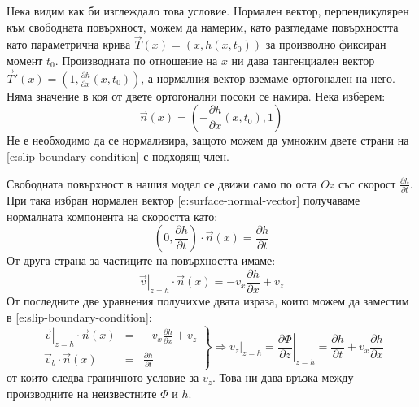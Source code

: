\documentclass[12pt]{article}
\numberwithin{equation}{section}
\begin{document}
Нека видим как би изглеждало това условие. Нормален вектор, перпендикулярен към свободната повърхност, можем да намерим, като разгледаме повърхността като параметрична крива $\vec{T}(x)=(x, h(x,t_0))$ за произволно фиксиран момент $t_0$. Производната по отношение на $x$ ни дава тангенциален вектор $\vec{T}'(x)=(1, \frac{\partial h}{\partial x}(x,t_0))$, а нормалния вектор вземаме ортогонален на него. Няма значение в коя от двете ортогонални посоки се намира. Нека изберем:
\begin{equation}
    \label{e:surface-normal-vector}
    \vec{n}(x)=(-\frac{\partial h}{\partial x}(x,t_0), 1)
\end{equation}
Не е необходимо да се нормализира, защото можем да умножим двете страни на \autoref{e:slip-boundary-condition} с подходящ член.

Свободната повърхност в нашия модел се движи само по оста $Oz$ със скорост $\frac{\partial h}{\partial t}$. При така избран нормален вектор \autoref{e:surface-normal-vector} получаваме нормалната компонента на скоростта като:
\begin{equation}
    (0, \frac{\partial h}{\partial t}) \cdot \vec{n}(x) = \frac{\partial h}{\partial t}
\end{equation}
От друга страна за частиците на повърхността имаме:
\begin{equation}
    \label{e:kinematic-condition-1}
    \left. \vec{v} \right|_{z=h}\cdot \vec{n}(x) = -v_x\frac{\partial h}{\partial x} + v_z
\end{equation}
От последните две уравнения получихме двата израза, които можем да заместим в \autoref{e:slip-boundary-condition}:
\begin{equation}
    \label{e:kinematic-condition-2}
    \left.
    \begin{aligned}
        \left. \vec{v} \right|_{z=h} \cdot \vec{n}(x) &=& -v_x\frac{\partial h}{\partial x} + v_z \\
        \vec{v}_b \cdot \vec{n}(x) &=& \frac{\partial h}{\partial t}
    \end{aligned}
    \right\rbrace
    \Rightarrow
    \left. v_z \right|_{z=h}
    = \left. \frac{\partial\Phi}{\partial z} \right|_{z=h}
    = \frac{\partial h}{\partial t} + v_x \frac{\partial h}{\partial x}
\end{equation}
от които следва граничното условие за $v_z$. Това ни дава връзка между производните на неизвестните $\Phi$ и $h$.
\end{document}
